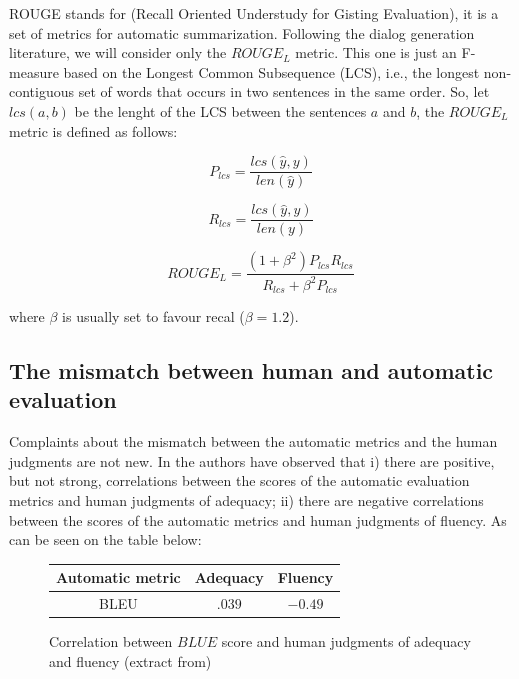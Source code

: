 ROUGE stands for (Recall Oriented Understudy for Gisting Evaluation), it is a set of metrics for automatic summarization\cite{Lin}. Following the dialog generation literature\cite{Lowe:2016}, we will consider only the $ROUGE_L$ metric. This one is just an F-measure based on the Longest Common Subsequence (LCS), i.e., the longest non-contiguous set of words that occurs in two sentences in the same order. So, let $lcs(a,b)$ be the lenght of the LCS between the sentences $a$ and $b$, the $ROUGE_L$ metric is defined as follows: 

\begin{equation*}
P_{lcs} = \frac{lcs(\hat{y}, y)}{len(\hat{y})}
\end{equation*}    


\begin{equation*}
R_{lcs} = \frac{lcs(\hat{y}, y)}{len(y)}
\end{equation*}

\begin{equation*}
ROUGE_L = \frac{(1 + \beta^2) P_{lcs} R_{lcs}}{R_{lcs} + \beta^{2}P_{lcs}}
\end{equation*}

where $\beta$ is usually set to favour recal ($\beta = 1.2$).

\subsection{The mismatch between human and automatic evaluation}

Complaints about the mismatch between the automatic metrics and the human judgments are not new. In  \cite{Stent} the authors have observed that i) there  are  positive,  but  not  strong,  correlations  between  the  scores  of the automatic evaluation metrics and human judgments of adequacy; ii) there are negative correlations between the scores of the automatic metrics and human judgments of fluency. As can be seen on the table below:

\begin{figure}[h]
\label{stenttable}
\begin{center}
\begin{tabular}{|c|c|c|}
\hline
\cellcolor{blue!10} Automatic metric & \cellcolor{blue!10} Adequacy & \cellcolor{blue!10} Fluency \\ \hline
BLEU & $.039$ & $-0.49$ \\ \hline
\end{tabular}
\end{center}
\caption{Correlation between $BLUE$ score and human judgments of adequacy and fluency (extract from\cite{Stent})}
\end{figure}

